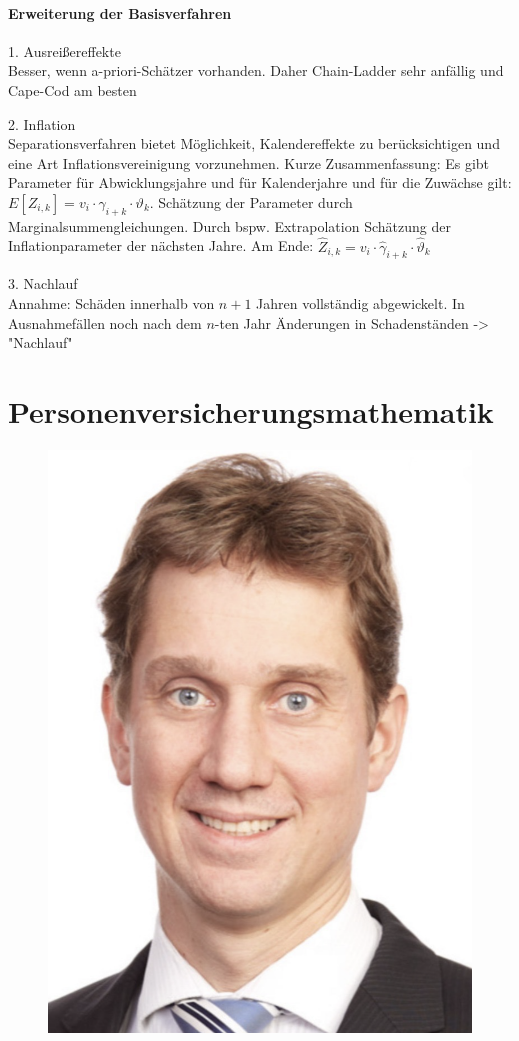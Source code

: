 \documentclass[12pt]{report}
\theoremstyle{dotless}
\theoremstyle{definition}
\begin{document}
\newpage
\subsubsection{Erweiterung der Basisverfahren}
1. Ausreißereffekte \\
Besser, wenn a-priori-Schätzer vorhanden. Daher Chain-Ladder sehr anfällig und Cape-Cod am besten

2. Inflation\\
Separationsverfahren bietet Möglichkeit, Kalendereffekte zu berücksichtigen und eine Art Inflationsvereinigung vorzunehmen. Kurze Zusammenfassung: Es gibt Parameter für Abwicklungsjahre und für Kalenderjahre und für die Zuwächse gilt: $E[Z_{i,k}]=v_i\cdot \gamma_{i+k}\cdot \vartheta_k$. Schätzung der Parameter durch Marginalsummengleichungen. Durch bspw. Extrapolation Schätzung der Inflationparameter der nächsten Jahre. Am Ende: $\hat{Z}_{i,k}= v_i \cdot \hat{\gamma}_{i+k} \cdot \hat{\vartheta}_k$ 

3. Nachlauf\\
Annahme: Schäden innerhalb von $n+1$ Jahren vollständig abgewickelt. In Ausnahmefällen noch nach dem $n$-ten Jahr Änderungen in Schadenständen -> "Nachlauf" 










\chapter{Personenversicherungsmathematik}

\begin{figure}[ht]
	\centering
	\includegraphics[width=.8\textwidth]{Bilder/Korbinian.png}
\end{figure}
\end{document}
